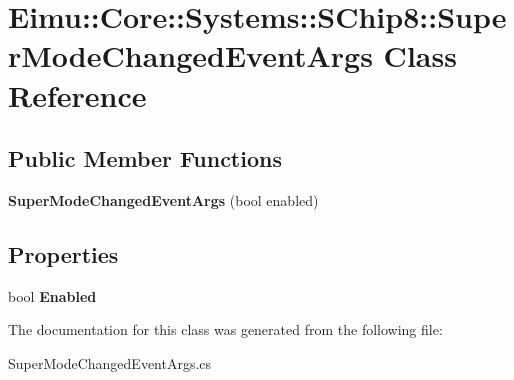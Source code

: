 \hypertarget{class_eimu_1_1_core_1_1_systems_1_1_s_chip8_1_1_super_mode_changed_event_args}{
\section{Eimu::Core::Systems::SChip8::SuperModeChangedEventArgs Class Reference}
\label{class_eimu_1_1_core_1_1_systems_1_1_s_chip8_1_1_super_mode_changed_event_args}
}
\subsection*{Public Member Functions}
\begin{DoxyCompactItemize}
\item 
\hypertarget{class_eimu_1_1_core_1_1_systems_1_1_s_chip8_1_1_super_mode_changed_event_args_a37334dc738470e1cf6b6b2b20bd76254}{
{\bfseries SuperModeChangedEventArgs} (bool enabled)}
\label{class_eimu_1_1_core_1_1_systems_1_1_s_chip8_1_1_super_mode_changed_event_args_a37334dc738470e1cf6b6b2b20bd76254}

\end{DoxyCompactItemize}
\subsection*{Properties}
\begin{DoxyCompactItemize}
\item 
\hypertarget{class_eimu_1_1_core_1_1_systems_1_1_s_chip8_1_1_super_mode_changed_event_args_afd1370ca13b53605f85212f71db75101}{
bool {\bfseries Enabled}}
\label{class_eimu_1_1_core_1_1_systems_1_1_s_chip8_1_1_super_mode_changed_event_args_afd1370ca13b53605f85212f71db75101}

\end{DoxyCompactItemize}


The documentation for this class was generated from the following file:\begin{DoxyCompactItemize}
\item 
SuperModeChangedEventArgs.cs\end{DoxyCompactItemize}

